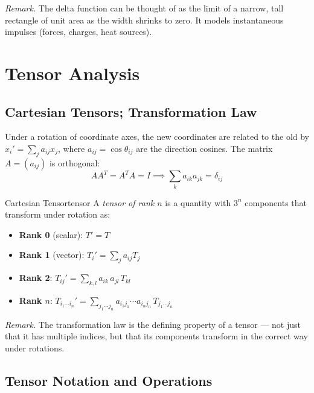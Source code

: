 \documentclass[11pt, letterpaper]{article}
\theoremstyle{plain}
\newenvironment{remark}{\smallskip\noindent\textit{Remark.}}{\smallskip}
\begin{document}
\begin{remark}
    The delta function can be thought of as the limit of a narrow, tall
    rectangle of unit area as the width shrinks to zero. It models
    instantaneous impulses (forces, charges, heat sources).
\end{remark}


\newpage
\section{Tensor Analysis}                      %

\subsection{Cartesian Tensors; Transformation Law}

Under a rotation of coordinate axes, the new coordinates are related to
the old by $x_i' = \sum_j a_{ij} x_j$, where $a_{ij} = \cos\theta_{ij}$
are the direction cosines. The matrix $A = (a_{ij})$ is orthogonal:
\[
    AA^T = A^TA = I \implies \sum_k a_{ik}a_{jk} = \delta_{ij}
\]

\begin{definition}{Cartesian Tensor}{tensor}
    A \emph{tensor of rank $n$} is a quantity with $3^n$ components that
    transform under rotation as:
    \begin{itemize}
        \item \textbf{Rank 0} (scalar): $T' = T$
        \item \textbf{Rank 1} (vector): $T_i' = \sum_j a_{ij} T_j$
        \item \textbf{Rank 2}: $T_{ij}' = \sum_{k,l} a_{ik}\,a_{jl}\,T_{kl}$
        \item \textbf{Rank $n$}: $T_{i_1\cdots i_n}' =
              \sum_{j_1\cdots j_n} a_{i_1 j_1}\cdots a_{i_n j_n}\,T_{j_1\cdots j_n}$
    \end{itemize}
\end{definition}

\begin{remark}
    The transformation law is the defining property of a tensor —
    not just that it has multiple indices, but that its components
    transform in the correct way under rotations.
\end{remark}


\subsection{Tensor Notation and Operations}
\end{document}
